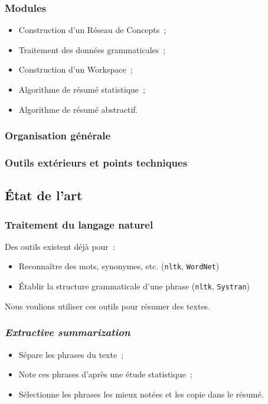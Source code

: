 \documentclass[12pt, handout]{beamer}
\begin{document}
\begin{frame}
 \frametitle{Modules}
 
 \begin{itemize}
  \item Construction d'un Réseau de Concepts~;
  \item Traitement des données grammaticales~;
  \item Construction d'un Workspace~;
  \item Algorithme de résumé statistique~;
  \item Algorithme de résumé abstractif.
 \end{itemize}
 
 
\end{frame}


\begin{frame}
 \frametitle{Organisation générale}
 
\end{frame}

\begin{frame}
 \frametitle{Outils extérieurs et points techniques}
 
\end{frame}

\subsection{État de l'art}

\begin{frame}
 \frametitle{Traitement du langage naturel}
 Des outils existent déjà pour~:
 \begin{itemize}
  \item Reconnaître des mots, synonymes, etc. (\texttt{nltk}, \texttt{WordNet})
  \item Établir la structure grammaticale d'une phrase (\texttt{nltk}, \texttt{Systran})
 \end{itemize}
 Nous voulions utiliser ces outils pour résumer des textes.
 
\end{frame}

\begin{frame}
 \frametitle{\textit{Extractive summarization}}
 \begin{itemize}
  \item Sépare les phrases du texte~;
  \item Note ces phrases d'après une étude statistique~;
  \item Sélectionne les phrases les mieux notées et les copie dans le résumé.
 \end{itemize}
 
\end{frame}
\end{document}
